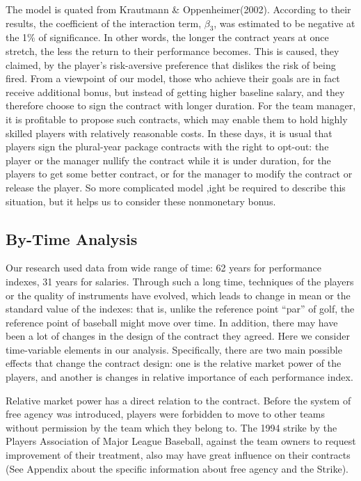 \documentclass[dvipdfmx, 12pt]{article}
\begin{document}
The model is quated from Krautmann \& Oppenheimer(2002). According to their results, the coefficient of the interaction term, $\beta_3$, was estimated to be negative at the 1\% of significance. In other words, the longer the contract years at once stretch, the less the return to their performance becomes. This is caused, they claimed, by the player's risk-aversive preference that dislikes the risk of being fired. From a viewpoint of our model, those who achieve their goals are in fact receive additional bonus, but instead of getting higher baseline salary, and they therefore choose to sign the contract with longer duration. For the team manager, it is profitable to propose such contracts, which may enable them to hold highly skilled players with relatively reasonable costs. In these days, it is usual that players sign the plural-year package contracts with the right to opt-out: the player or the manager nullify the contract while it is under duration, for the players to get some better contract, or for the manager to modify the contract or release the player. So more complicated model ,ight be required to describe this situation, but it helps us to consider these nonmonetary bonus.

\subsection{By-Time Analysis}

Our research used data from wide range of time: 62 years for performance indexes, 31 years for salaries. Through such a long time, techniques of the players or the quality of instruments have evolved, which leads to change in mean or the standard value of the indexes: that is, unlike the reference point ``par'' of golf, the reference point of baseball might move over time. In addition, there may have been a lot of changes in the design of the contract they agreed. Here we consider time-variable elements in our analysis. Specifically, there are two main possible effects that change the contract design: one is the relative market power of the players, and another is changes in relative importance of each performance index.

Relative market power has a direct relation to the contract. Before the system of free agency was introduced, players were forbidden to move to other teams without permission by the team which they belong to. The 1994 strike by the Players Association of Major League Baseball, against the team owners to request improvement of their treatment, also may have great influence on their contracts (See Appendix about the specific information about free agency and the Strike).
\end{document}
